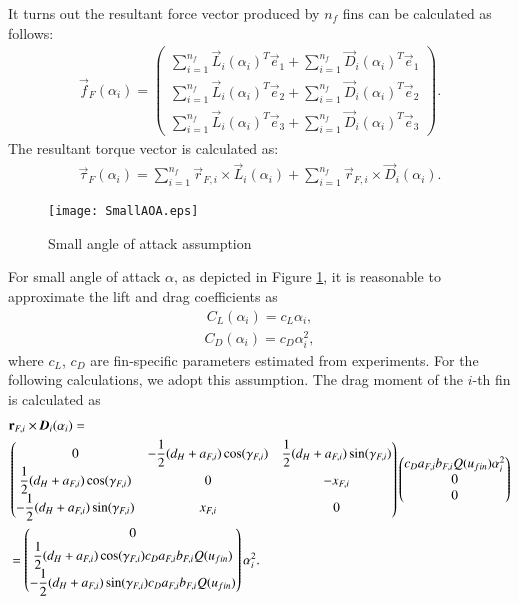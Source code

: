 It turns out the resultant force vector produced by $n_{f}$ fins can be calculated as follows: 
\begin{align}
\vec{f}_{F}(\alpha_{i} )=\begin{pmatrix} \sum _{ i=1 }^{ n_{f} }{ \vec{L}_{ i }(\alpha _{ i })^{ T }\vec{e}_{ 1 }+ } \sum _{ i=1 }^{ n_{f} }{ \vec{D}_{ i }(\alpha _{ i })^{ T }\vec{e}_{ 1 } }  \\ \sum _{ i=1 }^{ n_{f} }{\vec{L}_{ i }(\alpha _{ i })^{ T }\vec{e}_{ 2 }+ } \sum _{ i=1 }^{ n_{f} }{ \vec{D}_{ i }(\alpha _{ i })^{ T }\vec{e}_{ 2 } }  \\ \sum _{ i=1 }^{ n_{f} }{ \vec{L}_{ i }(\alpha _{ i })^{ T }\vec{e}_{ 3 }+ } \sum _{ i=1 }^{n_{f} }{ \vec{D}_{ i }(\alpha _{ i })^{ T }\vec{e}_{ 3 } }  \end{pmatrix}.
\end{align}
The resultant torque vector is calculated as:
\begin{align}
\vec{\tau} _{F}(\alpha_{i} )=\sum _{ i=1 }^{n_{f}}{ \vec{r}_{F,i} \times \vec{L}_{i}(\alpha_{i}) } +\sum _{ i=1 }^{n_{f}}{ \vec{r}_{F,i} \times \vec{D}_{i}(\alpha_{i})}.
\end{align}  
\begin{figure}
\texttt{[image: SmallAOA.eps]}
\caption{Small angle of attack assumption~\cite{FinModeling}}	
\label{FIG:smallAOA}
\end{figure}
For small angle of attack $\alpha$, as depicted in Figure \ref{FIG:smallAOA}, it is reasonable to approximate the lift and drag coefficients as
\begin{align}
C_{L}(\alpha_{i})=c_{L}\alpha_{i},
\end{align}    
\begin{align}
C_{D}(\alpha_{i})=c_{D}\alpha_{i}^{2},
\end{align}
where $c_{L}$, $c_{D}$ are fin-specific parameters estimated from experiments. For the following calculations, we adopt this assumption.
The drag moment of the $i$-th fin is calculated as
\begin{align}
&\vec{r}_{F,i}\times \emph{\textbf{D}}_{i}(\alpha_{i})= \nonumber \\
&\begin{pmatrix}
   0&-\dfrac{1}{2}(d_{H}+a_{F,i})\cos(\gamma_{F,i})&\dfrac{1}{2}(d_{H}+a_{F,i})\sin(\gamma_{F,i})\\
   \dfrac{1}{2}(d_{H}+a_{F,i})\cos(\gamma_{F,i})&0&-x_{F,i}\\
   -\dfrac{1}{2}(d_{H}+a_{F,i})\sin(\gamma_{F,i})&x_{F,i}&0
 \end{pmatrix} 
 \begin{pmatrix}
 c_{D}a_{F,i}b_{F,i}Q(u_{fin})\alpha_{i}^{2} \\0\\0
 \end{pmatrix} \nonumber \\
&=\begin{pmatrix}
0 \\
\dfrac{1}{2}(d_{H}+a_{F,i})\cos(\gamma_{F,i})c_{D}a_{F,i}b_{F,i}Q(u_{fin}) \\
-\dfrac{1}{2}(d_{H}+a_{F,i})\sin(\gamma_{F,i})c_{D}a_{F,i}b_{F,i}Q(u_{fin})
\end{pmatrix}
\alpha_{i}^{2}.
\end{align}
